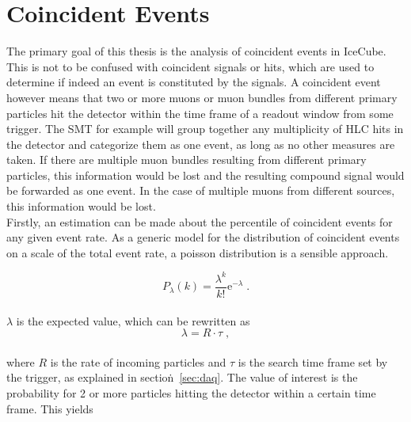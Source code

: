 
\section{Coincident Events}\label{sec:coin}

The primary goal of this thesis is the analysis of coincident events in IceCube. This is not to be confused with coincident signals or hits, which are used 
to determine if indeed an event is constituted by the signals. A coincident event however means that two or more muons or muon bundles from different primary 
particles hit the detector within the 
time frame of a readout window from some trigger. The SMT for example will group together any multiplicity of HLC hits in the detector and categorize them as one
event, as long as no other measures are taken. If there are multiple muon bundles resulting from different primary particles, this information would be lost 
and the resulting compound signal would be forwarded as one event. In the case of multiple muons from different sources, this information would be lost. \\
Firstly, an estimation can be made about the percentile of coincident events for any given event rate. As a generic model for the distribution of coincident 
events on a scale of the total event rate, a poisson distribution is a sensible approach. 

\begin{equation}
    P_{\lambda}(k) = \frac{\lambda^k}{k!}\text{e}^{-\lambda} \; .
\end{equation}\\

$\lambda$ is the expected value, which can be rewritten as \\

\begin{equation}
    \lambda = R \cdot \tau \; ,
\end{equation}\\

where $R$ is the rate of incoming particles and $\tau$ is the search time frame set by the trigger, as explained in section\.~\ref{sec:daq}. 
The value of interest is the probability for 2 or more particles hitting the detector within a certain time frame. This yields \\

